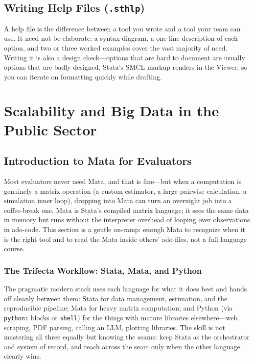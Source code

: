 \documentclass[
    a4paper,
    fontsize=10pt,
    twoside=true,
    numbers=noenddot,
]{kaobook}
\begin{document}
\section{Writing Help Files (\texttt{.sthlp})}
A help file is the difference between a tool you wrote and a tool your team can use. It need not be elaborate: a syntax diagram, a one-line description of each option, and two or three worked examples cover the vast majority of need. Writing it is also a design check---options that are hard to document are usually options that are badly designed. Stata's SMCL markup renders in the Viewer, so you can iterate on formatting quickly while drafting.

\chapter{Scalability and Big Data in the Public Sector}
\section{Introduction to Mata for Evaluators}
Most evaluators never need Mata, and that is fine---but when a computation is genuinely a matrix operation (a custom estimator, a large pairwise calculation, a simulation inner loop), dropping into Mata can turn an overnight job into a coffee-break one. Mata is Stata's compiled matrix language; it sees the same data in memory but runs without the interpreter overhead of looping over observations in ado-code. This section is a gentle on-ramp: enough Mata to recognize when it is the right tool and to read the Mata inside others' ado-files, not a full language course.

\subsection{The Trifecta Workflow: Stata, Mata, and Python}
The pragmatic modern stack uses each language for what it does best and hands off cleanly between them: Stata for data management, estimation, and the reproducible pipeline; Mata for heavy matrix computation; and Python (via \texttt{python:} blocks or \texttt{shell}) for the things with mature libraries elsewhere---web scraping, PDF parsing, calling an LLM, plotting libraries. The skill is not mastering all three equally but knowing the seams: keep Stata as the orchestrator and system of record, and reach across the seam only when the other language clearly wins.
\end{document}
